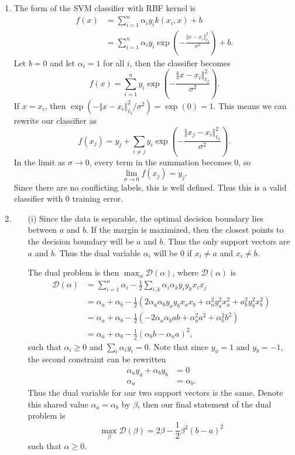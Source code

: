 \documentclass{article}
\begin{document}
\begin{enumerate}
	\item The form of the SVM classifier with RBF kernel is
		\begin{align*}
			f(x) &= \sum_{i=1}^n \alpha_i y_i k(x_i,x) + b \\
			     &= \sum_{i=1}^n \alpha_i y_i \exp\left( -\frac{\Vert{x-x_i}\Vert_{\ell_2}^2}{\sigma^2}  \right) + b.
		\end{align*}
		Let $b=0$ and let $\alpha_i=1$ for all $i$, then the classifier becomes
		\[
			f(x) = \sum_{i=1}^n y_i \exp\left( -\frac{\Vert{x-x_i}\Vert_{\ell_2}^2}{\sigma^2}  \right).
		\] 
		If $x=x_i$, then $\exp(-\Vert{x-x_i}\Vert_{\ell_2}^2 / \sigma^2) = \exp(0) = 1$. This means we can rewrite our classifier as
		\[
			f(x_j) = y_j + \sum_{i \neq j} y_i \exp\left( -\frac{\Vert{x_j-x_i}\Vert_{\ell_2}^2}{\sigma^2}  \right).
		\] 
		In the limit as $\sigma\to 0$, every term in the summation becomes 0, so
		\[
			\lim_{\sigma \to 0} f(x_j) = y_j.
		\] Since there are no conflicting labels, this is well defined. Thus this is a valid classifier with 0 training error.

	\item 
		\begin{enumerate}
			\item[(i)]
		Since the data is separable, the optimal decision boundary lies between $a$ and $b$. If the margin is maximized, then the closest points to the decision boundary will be $a$ and $b$. Thus the only support vectors are $a$ and $b$. Thus the dual variable $\alpha_i$ will be 0 if $x_i \neq a$ and $x_i \neq b$.

		The dual problem is then $\max_\alpha \mathcal{D}(\alpha)$, where $\mathcal{D}(\alpha)$ is
		\begin{align*}
			\mathcal{D(\alpha)} &= \sum_{i=1}^{n} \alpha_i - \frac{1}{2} \sum_{i,k} \alpha_i \alpha_k y_i y_k x_i x_j \\
			&= \alpha_a + \alpha_b - \frac{1}{2} \left( 2 \alpha_a \alpha_b y_a y_b x_a x_b + \alpha_a^2 y_a^2 x_a^2 + a_b^2 y_b^2 x_b^2 \right) \\
					    &= \alpha_a + \alpha_b - \frac{1}{2} \left( -2 \alpha_a \alpha_b a b + \alpha_a^2 a^2 + \alpha_b^2 b^2 \right) \\
					    &= \alpha_a + \alpha_b - \frac{1}{2} \left( \alpha_b b - \alpha_a a \right)^2,
		\end{align*}
		such that $\alpha_i \geq 0$ and $\sum_{i} \alpha_i y_i = 0$. Note that since $y_a = 1$ and $y_b=-1$, the second constraint can be rewritten
		\begin{align*}
			\alpha_a y_a + \alpha_b y_b &= 0 \\
			\alpha_a &= \alpha_b.
		\end{align*}
		Thus the dual variable for our two support vectors is the same. Denote this shared value $\alpha_a = \alpha_b$ by $\beta$, then our final statement of the dual problem is
		\[
			\max_\beta \mathcal{D}(\beta) = 2\beta - \frac{1}{2} \beta^2 (b-a)^2
		\] such that $\alpha \geq 0$.


\end{enumerate}
\end{enumerate}
\end{document}
